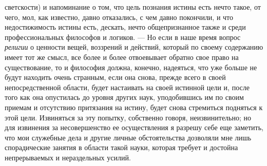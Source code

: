 \documentclass[twoside]{article}
\begin{document}
светскости) и напоминание о том, что цель познания истины есть нечто такое,
от чего, мол, как известно, давно отказались, с чем давно покончили, и
что недостижимость истины есть, дескать, нечто
общепризнанное также и среди профессиональных философов и логиков. —
Но если в наше время вопрос {\em религии} о ценности
вещей, воззрений и действий, который по своему содержанию имеет тот же
смысл, все более и более отвоевывает обратно свое право на существование,
то и философия должна, конечно, надеяться, что уже больше не будут находить
очень странным, если она снова, прежде всего в своей непосредственной
области, будет настаивать на своей истинной цели и, после того как она
опустилась до уровня других наук, уподобившись им по своим приемам и
отсутствию притязания на истину, будет снова стремиться подняться к этой
цели. Извиняться за эту попытку, собственно говоря, неизвинительно; но для
извинения за несовершенство ее осуществления я разрешу себе еще заметить,
что мои служебные дела и другие личные обстоятельства дозволяли мне лишь
спорадические занятия в области такой науки, которая требует и достойна
непрерываемых и нераздельных усилий.
\end{document}
